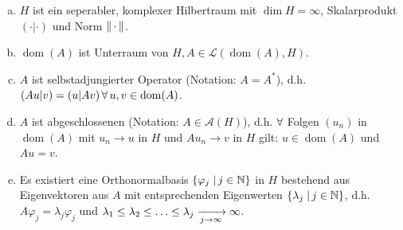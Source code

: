 \begin{vor}
\begin{enumerate}[(a)]
\item $H$ ist ein seperabler, komplexer Hilbertraum mit $\dim H = \infty$, Skalarprodukt $( \cdot | \cdot )$ und Norm $\lVert \, \cdot \, \rVert$.
\item $\operatorname{dom}(A)$ ist Unterraum von $H, A \in \mathcal L(\operatorname{dom}(A),H)$.
\item $A$ ist selbstadjungierter Operator (Notation: $A = A^\ast$), d.h. $(Au | v) = (u | Av) \, \forall \, u,v \in \operatorname{dom} (A)$.
\item $A$ ist abgeschlossenen (Notation: $A \in \mathcal A(H)$), d.h. $\forall $ Folgen $(u_n)$ in $\operatorname{dom}(A)$ mit $u_n \rightarrow u$ in $H$ und $Au_n \rightarrow v$ in $H$ gilt: $u \in \operatorname{dom}(A)$ und $Au = v$.
\item Es existiert eine Orthonormalbasis $\{\varphi_j \;\vert\, j \in \mathbb{N}\}$ in $H$ bestehend aus Eigenvektoren aus $A$ mit entsprechenden Eigenwerten $\{\lambda_j \;\vert\, j \in \mathbb{N}\}$, d.h. $A\varphi_j = \lambda_j \varphi_j$ und $\lambda_1 \leq \lambda_2 \leq \ldots \leq \lambda_j \xrightarrow[j\rightarrow \infty]{} \infty$.
\end{enumerate}
\end{vor}

